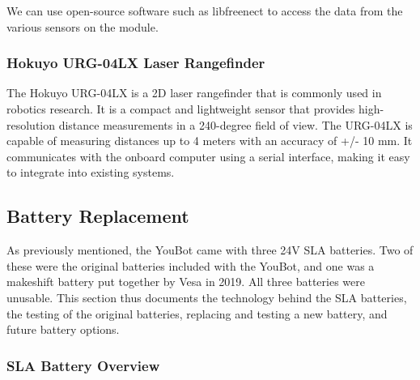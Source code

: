 \documentclass[a4paper, 12pt]{article}
\newif\ifshownotes
\newcommand{\notes}[1]{\ifshownotes\textcolor{blue}{#1}\fi}
\begin{document}
    We can use open-source software such as libfreenect to access the data from the various sensors on the module.


    \notes{discuss the libfreenect library, how to install it, and how it could be used within ROS.}


    \subsubsection{Hokuyo URG-04LX Laser Rangefinder}

    The Hokuyo URG-04LX is a 2D laser rangefinder that is commonly used in robotics research. It is a compact and lightweight sensor that provides high-resolution distance measurements in a 240-degree field of view. The URG-04LX is capable of measuring distances up to 4 meters with an accuracy of +/- 10 mm. It communicates with the onboard computer using a serial interface, making it easy to integrate into existing systems.

    \notes{discuss installing the drivers and whatnot, and how to use it within ROS and rqt.}

   
    \pagebreak

    \subsection{Battery Replacement}
    \label{sec:battery-replacement}



    \notes{draft 1, 11.05 12pm\\
    Here are some good web pages about the Slealed Lead Acid (SLA) batteries:
https://batterymasters.co.uk/blog/post/How%
and
https://www.power-sonic.com/blog/how-to-charge-a-lead-acid-battery/
and
https://www.powerstream.com/SLA.htm}

    As previously mentioned, the YouBot came with three 24V SLA batteries. Two of these were the original batteries included with the YouBot, and one was a makeshift battery put together by Vesa in 2019. All three batteries were unusable. This section thus documents the technology behind the SLA batteries, the testing of the original batteries, replacing and testing a new battery, and future battery options. 

    \subsubsection{SLA Battery Overview}
\end{document}
